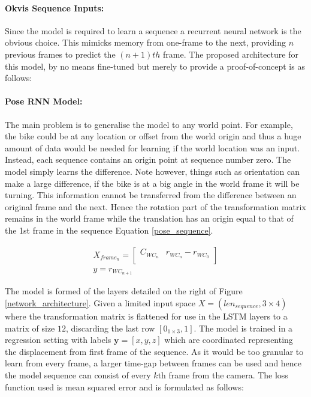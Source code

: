 \documentclass[11pt,twoside]{report}
\begin{document}
\paragraph{Okvis Sequence Inputs:}
Since the model is required to learn a sequence a recurrent neural network is the obvious choice. This mimicks memory from one-frame to the next, providing $n$ previous frames to predict the $(n+1)th$ frame. The proposed architecture for this model, by no means fine-tuned but merely to provide a proof-of-concept is as follows:

\paragraph{Pose RNN Model:} \label{pose_model}
The main problem is to generalise the model to any world point. For example, the bike could be at any location or offset from the world origin and thus a huge amount of data would be needed for learning if the world location was an input. Instead, each sequence contains an origin point at sequence number zero. The model simply learns the difference. Note however, things such as orientation can make a large difference, if the bike is at a big angle in the world frame it will be turning. This information cannot be transferred from the difference between an original frame and the next. Hence the rotation part of the transformation matrix remains in the world frame while the translation has an origin equal to that of the 1st frame in the sequence Equation \ref{pose_sequence}.


\begin{equation}
\begin{aligned}
X_{frame_{n}} = 
\begin{bmatrix}
C_{WC_n} & r_{WC_n}-r_{WC_0} \\
\end{bmatrix} \\
y = r_{WC_{n+1}}
\end{aligned}
\label{pose_sequence}
\end{equation}

The model is formed of the layers detailed on the right of Figure \ref{network_architecture}. Given a limited input space $X = (len_{sequence}, 3\times4)$ where the transformation matrix is flattened for use in the LSTM layers to a matrix of size $12$, discarding the last row $[0_{1 \times 3},1]$. The model is trained in a regression setting with labels $\mathbf{y}=[x,y,z]$ which are coordinated representing the displacement from first frame of the sequence. As it would be too granular to learn from every frame, a larger time-gap between frames can be used and hence the model sequence can consist of every $k$th frame from the camera. The loss function used is mean squared error and is formulated as follows:
\end{document}
